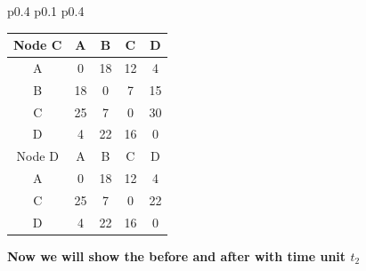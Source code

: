 \documentclass{article}
\begin{document}
\begin{tabular}{p{0.4\linewidth} p{0.1\linewidth} p{0.4\linewidth}}
\begin{tabular}{c|c|c|c|c}
    \hline
    \hline
    Node C & A & B & C & D \\
    \hline
    A & 0 & 18 & 12 & 4 \\
    B & 18 & 0 & 7 & 15 \\
    C & 25 & 7 & 0 & \color{red}30 \\
    D & 4 & 22 & 16 & 0 \\
    \hline
    \hline
    Node D & A & B & C & D \\
    \hline
    A & 0 & 18 & 12 & 4 \\
    C & 25 & 7 & 0 & 22 \\
    D & 4 & 22 & 16 & 0 \\
    \hline
\end{tabular}
\end{tabular}

\textbf{Now we will show the before and after with time unit $t_2$}\\
\newline
\end{document}

